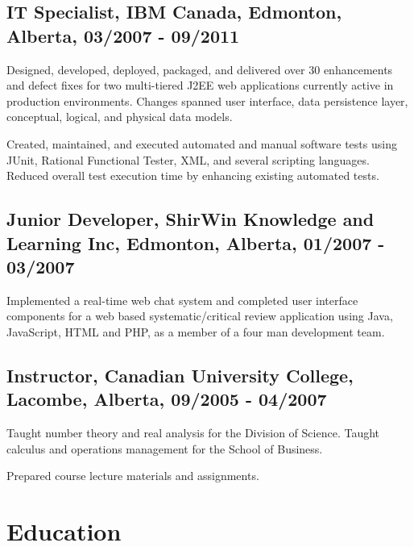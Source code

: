 \documentclass[10.5pt, letterpaper]{article}
\renewenvironment{itemize}{
  \begin{list}{}{
    \setlength{\leftmargin}{1.5em}
  }
}{
  \end{list}
}
\begin{document}
\subsection*{IT Specialist, IBM Canada, Edmonton, Alberta, 03/2007 - 09/2011}
\begin{itemize}
\item Designed, developed, deployed, packaged, and delivered over 30
enhancements and defect fixes for two multi-tiered J2EE web applications
currently active in production environments.  Changes spanned user interface, data persistence layer, conceptual, logical, and physical data models.
\item Created, maintained, and executed automated and manual
software tests using JUnit, Rational Functional Tester, XML, and
several scripting languages.  Reduced overall test execution time by enhancing existing automated tests.

\end{itemize}

\subsection*{Junior Developer, ShirWin Knowledge and Learning Inc, Edmonton, Alberta, 01/2007 - 03/2007}
\begin{itemize}
\item Implemented a real-time web chat system and completed user interface components for a web based systematic/critical review application using Java, JavaScript, HTML and PHP, as a member of a four man development team.
\end{itemize}

\subsection*{Instructor, Canadian University College, Lacombe, Alberta, 09/2005 - 04/2007}
\begin{itemize}
\item Taught number theory and real analysis for the Division of Science.  Taught calculus and operations management for the School of Business.
\item Prepared course lecture materials and assignments.
\end{itemize}

\section*{Education}
\end{document}

